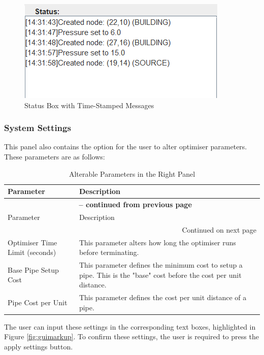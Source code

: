 \begin{figure}[H]
    \centering
    \includegraphics[width=0.5\linewidth]{statusareacloseup.png}
    \caption{Status Box with Time-Stamped Messages}
    \label{fig:statusareawithmessages}
\end{figure}

\subsubsection{System Settings}
This panel also contains the option for the user to alter optimiser parameters. These parameters are as follows:

\begin{longtable}{l p{9cm}}
\caption{Alterable Parameters in the Right Panel}\label{table:alterableparameters} \\
\toprule
Parameter & Description \\
\midrule
\endfirsthead

\multicolumn{2}{c}{{\bfseries \tablename\ \thetable{} -- continued from previous page}} \\
\toprule
Parameter & Description \\
\midrule
\endhead

\midrule \multicolumn{2}{r}{{Continued on next page}} \\
\endfoot

\bottomrule
\endlastfoot

Optimiser Time Limit (seconds) & This parameter alters how long the optimiser runs before terminating.\\
Base Pipe Setup Cost & This parameter defines the minimum cost to setup a pipe. This is the "base" cost before the cost per unit distance.\\
Pipe Cost per Unit & This parameter defines the cost per unit distance of a pipe.\\
\end{longtable}

The user can input these settings in the corresponding text boxes, highlighted in Figure \ref{fig:guimarkup}. To confirm these settings, the user is required to press the apply settings button.

